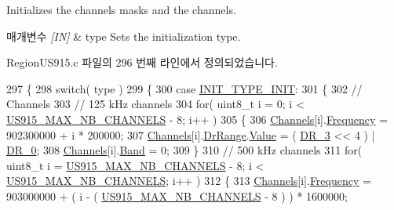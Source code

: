 Initializes the channels masks and the channels. 


\begin{DoxyParams}{매개변수}
{\em \mbox{[}\+I\+N\mbox{]}} & type Sets the initialization type. \\
\hline
\end{DoxyParams}


Region\+U\+S915.\+c 파일의 296 번째 라인에서 정의되었습니다.


\begin{DoxyCode}
297 \{
298     \textcolor{keywordflow}{switch}( type )
299     \{
300         \textcolor{keywordflow}{case} \mbox{\hyperlink{group___r_e_g_i_o_n_gga11ecad794560a3d3961bdf1c9a27d3b2a5065ce7a587a2aeff0da16507222c4d7}{INIT\_TYPE\_INIT}}:
301         \{
302             \textcolor{comment}{// Channels}
303             \textcolor{comment}{// 125 kHz channels}
304             \textcolor{keywordflow}{for}( uint8\_t i = 0; i < \mbox{\hyperlink{group___r_e_g_i_o_n_u_s915_ga417ab6531cbaef476634d7ba0b04c20f}{US915\_MAX\_NB\_CHANNELS}} - 8; i++ )
305             \{
306                 \mbox{\hyperlink{_region_u_s915_8c_a83f8d040b2c69b3b4ed9ff970b0efcfb}{Channels}}[i].\mbox{\hyperlink{structs_channel_params_ade3d190636488dad9a89b19446b7acf1}{Frequency}} = 902300000 + i * 200000;
307                 \mbox{\hyperlink{_region_u_s915_8c_a83f8d040b2c69b3b4ed9ff970b0efcfb}{Channels}}[i].\mbox{\hyperlink{structs_channel_params_ad4d9b041ea740886a05fa8a1d06997a2}{DrRange}}.\mbox{\hyperlink{unionu_dr_range_ae1e3e8696366e3256e397bbdc4e34775}{Value}} = ( \mbox{\hyperlink{group___r_e_g_i_o_n_ga3627849e6360cd275bc74dc519653820}{DR\_3}} << 4 ) | 
      \mbox{\hyperlink{group___r_e_g_i_o_n_ga6c4ef966b4f3d5eb7597b087f2b97095}{DR\_0}};
308                 \mbox{\hyperlink{_region_u_s915_8c_a83f8d040b2c69b3b4ed9ff970b0efcfb}{Channels}}[i].\mbox{\hyperlink{structs_channel_params_a724c03aa06953111c3291243831f251b}{Band}} = 0;
309             \}
310             \textcolor{comment}{// 500 kHz channels}
311             \textcolor{keywordflow}{for}( uint8\_t i = \mbox{\hyperlink{group___r_e_g_i_o_n_u_s915_ga417ab6531cbaef476634d7ba0b04c20f}{US915\_MAX\_NB\_CHANNELS}} - 8; i < 
      \mbox{\hyperlink{group___r_e_g_i_o_n_u_s915_ga417ab6531cbaef476634d7ba0b04c20f}{US915\_MAX\_NB\_CHANNELS}}; i++ )
312             \{
313                 \mbox{\hyperlink{_region_u_s915_8c_a83f8d040b2c69b3b4ed9ff970b0efcfb}{Channels}}[i].\mbox{\hyperlink{structs_channel_params_ade3d190636488dad9a89b19446b7acf1}{Frequency}} = 903000000 + ( i - ( 
      \mbox{\hyperlink{group___r_e_g_i_o_n_u_s915_ga417ab6531cbaef476634d7ba0b04c20f}{US915\_MAX\_NB\_CHANNELS}} - 8 ) ) * 1600000;

\end{DoxyCode}
